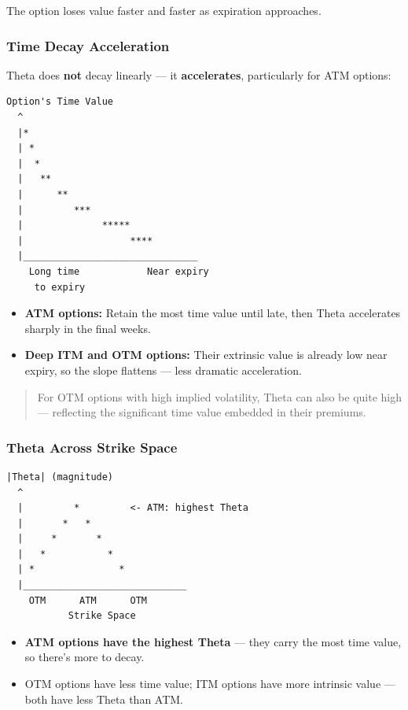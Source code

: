 \documentclass[12pt,openany]{book}
\begin{document}
The option loses value faster and faster as expiration approaches.

\subsubsection{Time Decay Acceleration}

Theta does \textbf{not} decay linearly — it \textbf{accelerates}, particularly for ATM options:

\begin{center}
\begin{Verbatim}[fontsize=\small,breaklines=true]
Option's Time Value
  ^
  |*
  | *
  |  *
  |   **
  |      **
  |         ***
  |              *****
  |                   ****
  |_______________________________
    Long time            Near expiry
     to expiry
\end{Verbatim}
\end{center}

\begin{itemize}[leftmargin=*]
    \item \textbf{ATM options:} Retain the most time value until late, then Theta accelerates sharply in the final weeks.
    \item \textbf{Deep ITM and OTM options:} Their extrinsic value is already low near expiry, so the slope flattens — less dramatic acceleration.
\end{itemize}

\begin{quote}
For OTM options with high implied volatility, Theta can also be quite high — reflecting the significant time value embedded in their premiums.
\end{quote}

\subsubsection{Theta Across Strike Space}

\begin{center}
\begin{Verbatim}[fontsize=\small,breaklines=true]
|Theta| (magnitude)
  ^
  |         *         <- ATM: highest Theta
  |       *   *
  |     *       *
  |   *           *
  | *               *
  |_____________________________
    OTM      ATM      OTM
           Strike Space
\end{Verbatim}
\end{center}

\begin{itemize}[leftmargin=*]
    \item \textbf{ATM options have the highest Theta} — they carry the most time value, so there's more to decay.
    \item OTM options have less time value; ITM options have more intrinsic value — both have less Theta than ATM.
\end{itemize}
\end{document}
